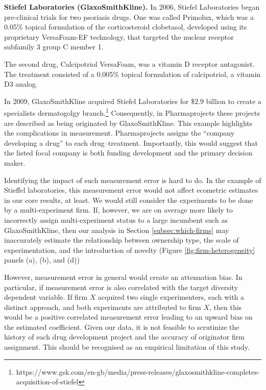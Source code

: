 \textbf{Stiefel Laboratories (GlaxoSmithKline).} In 2006, Stiefel Laboratories began pre-clinical trials for two psoriasis drugs. One was called Primolux, which was a 0.05\% topical formulation of the corticosteroid clobetasol, developed using its proprietary VersaFoam-EF technology, that targeted the nuclear receptor subfamily 3 group C member 1.

The second drug, Calcipotriol VersaFoam, was a vitamin D receptor antagonist. The treatment consisted of a 0.005\% topical formulation of calcipotriol, a vitamin D3 analog.

In 2009, GlaxoSmithKline acquired Stiefel Laboratories for \$2.9 billion to create a specialists dermatogolgy branch.\footnote{https://www.gsk.com/en-gb/media/press-releases/glaxosmithkline-completes-acquisition-of-stiefel} Consequently, in Pharmaprojects these projects are described as being originated by GlaxoSmithKline. This example highlights the complications in measurement. Pharmaprojects assigns the ``company developing a drug'' to each drug--treatment. Importantly, this would suggest that the listed focal company is both funding development and the primary decision maker.

Identifying the impact of such measurement error is hard to do. In the example of Stieffel laboratories, this measurement error would not affect ecometric estimates in our core results, at least. We would still consider the experiments to be done by a multi-experiment firm. If, however, we are on average more likely to incorrectly assign multi-experiment status to a large incumbent such as GlaxoSmithKline, then our analysis in Section \ref{subsec:which-firms} may inaccurately estimate the relationship between ownership type, the scale of experimentation, and the introduction of novelty (Figure \ref{fig:firm-heterogeneity} panels (a), (b), and (d)) 

However, measurement error in general would create an attenuation bias. In particular, if measurement error is also correlated with the target diversity dependent variable. If firm $X$ acquired two single experimenters, each with a distinct approach, and both experiments are attributed to firm $X$, then this would be a positive correlated measurement error leading to an upward bias on the estimated coefficient. Given our data, it is not feasible to scrutinize the history of each drug development project and the accuracy of originator firm assignment. This should be recognised as an empirical limitation of this study.